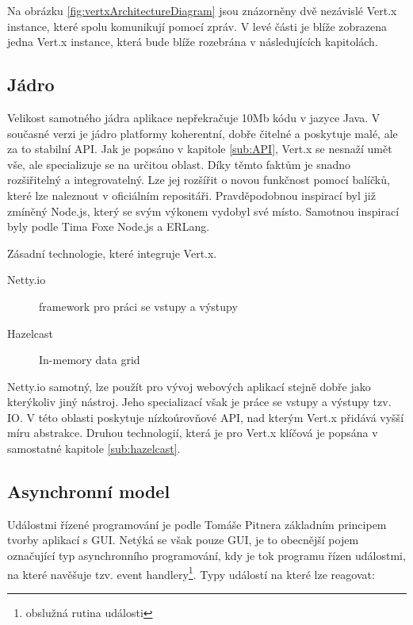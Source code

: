 Na obrázku \ref{fig:vertxArchitectureDiagram} jsou znázorněny dvě nezávislé Vert.x instance, které spolu komunikují pomocí zpráv. V levé části je blíže zobrazena jedna Vert.x instance, která bude blíže rozebrána v následujících kapitolách.

\subsection{Jádro}

Velikost samotného jádra aplikace nepřekračuje 10Mb kódu v jazyce Java. V současné verzi je jádro platformy koherentní, dobře čitelné a poskytuje malé, ale za to stabilní API. Jak je popsáno v kapitole \ref{sub:API}, Vert.x se nesnaží umět vše, ale specializuje se na určitou oblast. Díky těmto faktům je snadno rozšiřitelný a integrovatelný. Lze jej rozšířit o novou funkčnost pomocí balíčků, které lze naleznout v oficiálním repositáři. Pravděpodobnou inspirací byl již zmíněný Node.js, který se svým výkonem vydobyl své místo. Samotnou inspirací byly podle Tima Foxe Node.js a ERLang\cite{vertxNodejs}.

\noindent Zásadní technologie, které integruje Vert.x.
\begin{description}
\item[Netty.io] framework pro práci se vstupy a výstupy
\item[Hazelcast] In-memory data grid\cite{inMemoryDataGrid}
\end{description}

Netty.io samotný, lze použít pro vývoj webových aplikací stejně dobře jako kterýkoliv jiný nástroj. Jeho specializací však je práce se vstupy a výstupy tzv. IO. V této oblasti poskytuje nízkoúrovňové API, nad kterým Vert.x přidává vyšší míru abstrakce. Druhou technologií, která je pro Vert.x klíčová je popsána v samostatné kapitole \ref{sub:hazelcast}.

\subsection{Asynchronní model}

Událostmi řízené programování je podle Tomáše Pitnera\cite{javaProgramovani} základním principem \\tvorby aplikací s GUI. Netýká se však pouze GUI, je to obecnější pojem označující typ asynchronního programování, kdy je tok programu řízen událostmi, na které navěšuje tzv. event handlery\footnote{obslužná rutina události}. Typy událostí na které lze reagovat:

